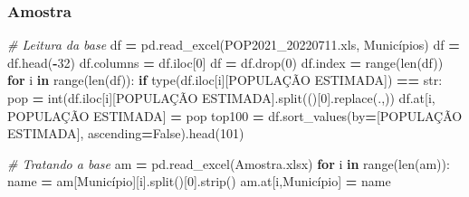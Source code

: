 \documentclass[
  12,
  dvipsnames]{article}
\newenvironment{Shaded}{\begin{snugshade}}{\end{snugshade}}
\newcommand{\BuiltInTok}[1]{#1}
\newcommand{\CommentTok}[1]{\textcolor[rgb]{0.56,0.35,0.01}{\textit{#1}}}
\newcommand{\ControlFlowTok}[1]{\textcolor[rgb]{0.13,0.29,0.53}{\textbf{#1}}}
\newcommand{\DecValTok}[1]{\textcolor[rgb]{0.00,0.00,0.81}{#1}}
\newcommand{\KeywordTok}[1]{\textcolor[rgb]{0.13,0.29,0.53}{\textbf{#1}}}
\newcommand{\NormalTok}[1]{#1}
\newcommand{\OperatorTok}[1]{\textcolor[rgb]{0.81,0.36,0.00}{\textbf{#1}}}
\newcommand{\StringTok}[1]{\textcolor[rgb]{0.31,0.60,0.02}{#1}}
\newcommand{\VariableTok}[1]{\textcolor[rgb]{0.00,0.00,0.00}{#1}}
\begin{document}
\hypertarget{amostra}{%
\subsubsection*{Amostra}\label{amostra}}

\begin{Shaded}
\begin{Highlighting}[]
\CommentTok{\# Leitura da base}
\NormalTok{df }\OperatorTok{=}\NormalTok{ pd.read\_excel(}\StringTok{\textquotesingle{}POP2021\_20220711.xls\textquotesingle{}}\NormalTok{, }\StringTok{\textquotesingle{}Municípios\textquotesingle{}}\NormalTok{)}
\NormalTok{df }\OperatorTok{=}\NormalTok{ df.head(}\OperatorTok{{-}}\DecValTok{32}\NormalTok{)}
\NormalTok{df.columns }\OperatorTok{=}\NormalTok{ df.iloc[}\DecValTok{0}\NormalTok{]}
\NormalTok{df }\OperatorTok{=}\NormalTok{ df.drop(}\DecValTok{0}\NormalTok{)}
\NormalTok{df.index }\OperatorTok{=} \BuiltInTok{range}\NormalTok{(}\BuiltInTok{len}\NormalTok{(df))}
\ControlFlowTok{for}\NormalTok{ i }\KeywordTok{in} \BuiltInTok{range}\NormalTok{(}\BuiltInTok{len}\NormalTok{(df)):}
    \ControlFlowTok{if} \BuiltInTok{type}\NormalTok{(df.iloc[i][}\StringTok{\textquotesingle{}POPULAÇÃO ESTIMADA\textquotesingle{}}\NormalTok{]) }\OperatorTok{==} \BuiltInTok{str}\NormalTok{:}
\NormalTok{        pop }\OperatorTok{=} \BuiltInTok{int}\NormalTok{(df.iloc[i][}\StringTok{\textquotesingle{}POPULAÇÃO ESTIMADA\textquotesingle{}}\NormalTok{].split(}\StringTok{\textquotesingle{}(\textquotesingle{}}\NormalTok{)[}\DecValTok{0}\NormalTok{].replace(}\StringTok{\textquotesingle{}.\textquotesingle{}}\NormalTok{,}\StringTok{\textquotesingle{}\textquotesingle{}}\NormalTok{))}
\NormalTok{        df.at[i, }\StringTok{\textquotesingle{}POPULAÇÃO ESTIMADA\textquotesingle{}}\NormalTok{] }\OperatorTok{=}\NormalTok{ pop}
\NormalTok{top100 }\OperatorTok{=}\NormalTok{ df.sort\_values(by}\OperatorTok{=}\NormalTok{[}\StringTok{\textquotesingle{}POPULAÇÃO ESTIMADA\textquotesingle{}}\NormalTok{], ascending}\OperatorTok{=}\VariableTok{False}\NormalTok{).head(}\DecValTok{101}\NormalTok{)}

\CommentTok{\# Tratando a base}
\NormalTok{am }\OperatorTok{=}\NormalTok{ pd.read\_excel(}\StringTok{\textquotesingle{}Amostra.xlsx\textquotesingle{}}\NormalTok{)}
\ControlFlowTok{for}\NormalTok{ i }\KeywordTok{in} \BuiltInTok{range}\NormalTok{(}\BuiltInTok{len}\NormalTok{(am)):}
\NormalTok{    name }\OperatorTok{=}\NormalTok{ am[}\StringTok{\textquotesingle{}Município\textquotesingle{}}\NormalTok{][i].split(}\StringTok{\textquotesingle{}{-}\textquotesingle{}}\NormalTok{)[}\DecValTok{0}\NormalTok{].strip()}
\NormalTok{    am.at[i,}\StringTok{\textquotesingle{}Município\textquotesingle{}}\NormalTok{] }\OperatorTok{=}\NormalTok{ name}


\end{Highlighting}
\end{Shaded}
\end{document}
